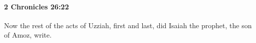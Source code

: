 
		\paragraph{2 Chronicles 26:22} %
			\label{2CHRONICLES-26-22}

			Now the rest of the acts of Uzziah, first and last, did Isaiah the prophet, the son of Amoz, write.


